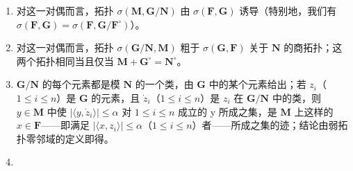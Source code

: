\begin{enumerate}
\def\labelenumi{(\roman{enumi})}
\item
  对这一对偶而言，拓扑 \(\sigma(\mathbf{M},\mathbf{G} / \mathbf{N})\) 由 \(\sigma(\mathbf{F},\mathbf{G})\) 诱导（特别地，我们有 \(\sigma(\mathbf{F},\mathbf{G}) = \sigma(\mathbf{F},\mathbf{G} / \mathbf{F}^{\circ})\)）。
\item
  对这一对偶而言，拓扑 \(\sigma(\mathbf{G}/\mathbf{N}, \mathbf{M})\) 粗于 \(\sigma(\mathbf{G}, \mathbf{F})\) 关于 \(\mathbf{N}\) 的商拓扑；这两个拓扑相同当且仅当 \(\mathbf{M} + \mathbf{G}^{\circ} = \mathbf{N}^{\circ}\)。
\setcounter{enumi}{0}
\item
  \(\mathbf{G} / \mathbf{N}\) 的每个元素都是模 \(\mathbf{N}\) 的一个类，由 \(\mathbf{G}\) 中的某个元素给出；若 \(z_{i}\)（\(1 \leqslant i \leqslant n\)）是 \(\mathbf{G}\) 的元素，且 \(\dot{z}_{i}\)（\(1 \leqslant i \leqslant n\)）是 \(z_{i}\) 在 \(\mathbf{G} / \mathbf{N}\) 中的类，则 \(y \in \mathbf{M}\) 中使 \(|\langle y, \dot{z}_{i} \rangle| \leqslant \alpha\) 对 \(1 \leqslant i \leqslant n\) 成立的 y 所成之集，是 \(\mathbf{M}\) 上这样的 \(x \in \mathbf{F}\)——即满足 \(|\langle x, z_{i} \rangle| \leqslant \alpha\)（\(1 \leqslant i \leqslant n\)）者——所成之集的迹；结论由弱拓扑零邻域的定义即得。
\item

\end{enumerate}
